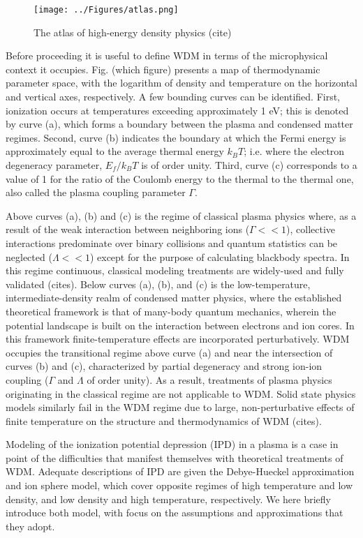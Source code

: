 \documentclass [11pt, proquest, article] {uwthesis}[2016/11/22]
\begin{document}
\begin{figure}[h] \label{fig:atlas}
\caption{The atlas of high-energy density physics (cite)}
\centering
\texttt{[image: ../Figures/atlas.png]}
\end{figure}

Before proceeding it is useful to define WDM in terms of the microphysical context it occupies. Fig. (which figure) presents a map of thermodynamic parameter space, with the logarithm of density and temperature on the horizontal and vertical axes, respectively. A few bounding curves can be identified. First, ionization occurs at temperatures exceeding approximately 1 eV; this is denoted by curve (a), which forms a boundary between the plasma and condensed matter regimes. Second, curve (b) indicates the boundary at which the Fermi energy is approximately equal to the average thermal energy $k_BT$; i.e. where the electron degeneracy parameter, $E_f/k_B T$ is of order unity. Third, curve (c) corresponds to a value of 1 for the ratio of the Coulomb energy to the thermal to the thermal one, also called the plasma coupling parameter  $\Gamma$. 

Above curves (a), (b) and (c) is the regime of classical plasma physics where, as a result of the weak interaction between neighboring ions ($\Gamma << 1$), collective interactions predominate over binary collisions and quantum statistics can be neglected ($\Lambda << 1$) except for the purpose of calculating blackbody spectra. In this regime continuous, classical modeling treatments are widely-used and fully validated (cites). Below curves (a), (b), and (c) is the low-temperature, intermediate-density realm of condensed matter physics, where the established theoretical framework is that of many-body quantum mechanics, wherein the potential landscape is built on the interaction between electrons and ion cores. In this framework finite-temperature effects are incorporated perturbatively. WDM occupies the transitional regime above curve (a) and near the intersection of curves (b) and (c), characterized by partial degeneracy and strong ion-ion coupling ($\Gamma$ and $\Lambda$ of order unity). As a result, treatments of plasma physics originating in the classical regime are not applicable to WDM. Solid state physics models similarly fail in the WDM regime due to large, non-perturbative effects of finite temperature on the structure and thermodynamics of WDM (cites).  

Modeling of the ionization potential depression (IPD) in a plasma is a case in point of the difficulties that manifest themselves with theoretical treatments of WDM. Adequate descriptions of IPD are given the Debye-Hueckel approximation and ion sphere model, which cover opposite regimes of high temperature and low density, and low density and high temperature, respectively. We here briefly introduce both model, with focus on the assumptions and approximations that they adopt.
\end{document}
